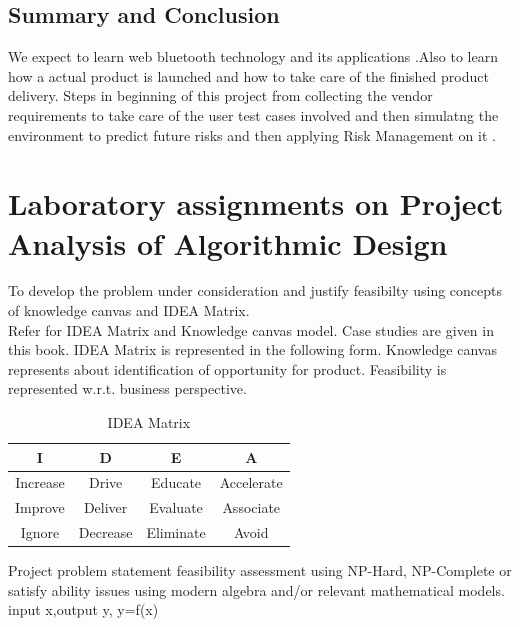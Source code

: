 \documentclass[oneside,a4paper,12pt]{report}
\begin{document}


\begin{appendices}
\section{Summary and Conclusion}
We expect to learn web bluetooth technology and its applications .Also to learn how a actual product is launched and how to take care of the finished product delivery.
Steps in beginning of  this project from collecting the vendor requirements to take  care of the user test cases involved and then simulatng the environment to predict future risks and then applying Risk Management on it .


\chapter{Laboratory assignments on Project Analysis of Algorithmic Design}

To develop the problem under consideration and justify feasibilty using
concepts of knowledge canvas and IDEA Matrix.\\
Refer \cite{innovationbook} for IDEA Matrix and Knowledge canvas model. Case studies are given in this book. IDEA Matrix is represented in the following form. Knowledge canvas represents about identification  of opportunity for product. Feasibility is represented w.r.t. business perspective.\\ 

\begin{table}[!htbp]
\begin{center}
  \begin{tabular}{| c | c | c | c |}
\hline
 I & D & E & A \\ 
\hline
Increase & Drive & Educate & Accelerate \\
\hline
Improve & Deliver & Evaluate & Associate  \\
 \hline
Ignore & Decrease & Eliminate & Avoid \\
\hline
\end{tabular}
 \caption { IDEA Matrix }
 \label{tab:imatrix}
\end{center}
\end{table}

Project problem statement feasibility assessment using NP-Hard, NP-Complete or satisfy ability issues using modern algebra and/or relevant mathematical models.
 input x,output y, y=f(x)












\end{appendices}
\end{document}
